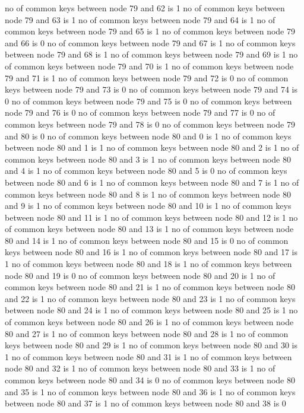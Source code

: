 no of common keys between node 79 and 62 is 1
no of common keys between node 79 and 63 is 1
no of common keys between node 79 and 64 is 1
no of common keys between node 79 and 65 is 1
no of common keys between node 79 and 66 is 0
no of common keys between node 79 and 67 is 1
no of common keys between node 79 and 68 is 1
no of common keys between node 79 and 69 is 1
no of common keys between node 79 and 70 is 1
no of common keys between node 79 and 71 is 1
no of common keys between node 79 and 72 is 0
no of common keys between node 79 and 73 is 0
no of common keys between node 79 and 74 is 0
no of common keys between node 79 and 75 is 0
no of common keys between node 79 and 76 is 0
no of common keys between node 79 and 77 is 0
no of common keys between node 79 and 78 is 0
no of common keys between node 79 and 80 is 0
no of common keys between node 80 and 0 is 1
no of common keys between node 80 and 1 is 1
no of common keys between node 80 and 2 is 1
no of common keys between node 80 and 3 is 1
no of common keys between node 80 and 4 is 1
no of common keys between node 80 and 5 is 0
no of common keys between node 80 and 6 is 1
no of common keys between node 80 and 7 is 1
no of common keys between node 80 and 8 is 1
no of common keys between node 80 and 9 is 1
no of common keys between node 80 and 10 is 1
no of common keys between node 80 and 11 is 1
no of common keys between node 80 and 12 is 1
no of common keys between node 80 and 13 is 1
no of common keys between node 80 and 14 is 1
no of common keys between node 80 and 15 is 0
no of common keys between node 80 and 16 is 1
no of common keys between node 80 and 17 is 1
no of common keys between node 80 and 18 is 1
no of common keys between node 80 and 19 is 0
no of common keys between node 80 and 20 is 1
no of common keys between node 80 and 21 is 1
no of common keys between node 80 and 22 is 1
no of common keys between node 80 and 23 is 1
no of common keys between node 80 and 24 is 1
no of common keys between node 80 and 25 is 1
no of common keys between node 80 and 26 is 1
no of common keys between node 80 and 27 is 1
no of common keys between node 80 and 28 is 1
no of common keys between node 80 and 29 is 1
no of common keys between node 80 and 30 is 1
no of common keys between node 80 and 31 is 1
no of common keys between node 80 and 32 is 1
no of common keys between node 80 and 33 is 1
no of common keys between node 80 and 34 is 0
no of common keys between node 80 and 35 is 1
no of common keys between node 80 and 36 is 1
no of common keys between node 80 and 37 is 1
no of common keys between node 80 and 38 is 0
